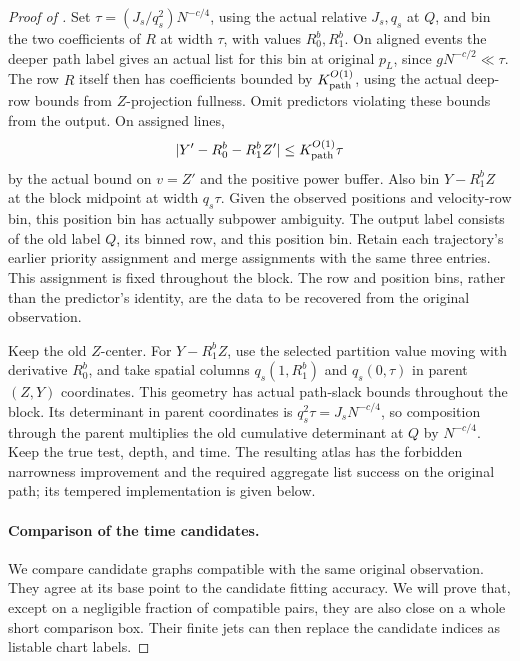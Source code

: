 \begin{proof}[Proof of ]
Set \(\tau=(J_s/q_s^2)N^{-c/4}\), using the actual relative
\(J_s,q_s\) at \(Q\), and bin the two coefficients of \(R\)
at width \(\tau\), with values \(R_0^b,R_1^b\).
On aligned events the deeper path label gives an actual list
for this bin at original \(p_L\), since
\(gN^{-c/2}\ll\tau\).  The row \(R\) itself then has coefficients
bounded by \(K_{\rm path}^{O(1)}\), using the actual deep-row
bounds from \(Z\)-projection fullness.  Omit predictors violating
these bounds from the output.  On assigned lines,
\begin{equation}
|Y'-R_0^b-R_1^b Z'|\le K_{\rm path}^{O(1)}\tau
\end{equation}
by the actual bound on \(v=Z'\) and the positive power buffer.
Also bin \(Y-R_1^bZ\) at the block midpoint at width \(q_s\tau\).
Given the observed positions and velocity-row bin, this position
bin has actually subpower ambiguity.  The output label consists of the old label \(Q\), its binned row, and
this position bin.  Retain each trajectory's earlier priority assignment and merge
assignments with the same three entries.  This assignment is fixed throughout the
block.  The row and position bins, rather than the predictor's identity,
are the data to be recovered from the original observation.

Keep the old \(Z\)-center.  For \(Y-R_1^bZ\), use the selected
partition value moving with derivative \(R_0^b\), and take spatial
columns \(q_s(1,R_1^b)\) and \(q_s(0,\tau)\) in parent
\((Z,Y)\) coordinates.  This geometry has actual path-slack bounds
throughout the block.  Its determinant in parent coordinates is
\(q_s^2\tau=J_sN^{-c/4}\), so composition through the parent
multiplies the old cumulative determinant at \(Q\) by \(N^{-c/4}\).
Keep the true test, depth, and time.  The resulting atlas has the
forbidden narrowness improvement and the required aggregate list
success on the original path; its tempered implementation is given
below.

\paragraph{Comparison of the time candidates.}
We compare candidate graphs compatible with the same original
observation.  They agree at its base point to the candidate fitting
accuracy.  We will prove that, except
on a negligible fraction of compatible pairs, they are also close on
a whole short comparison box.  Their finite jets can then replace the
candidate indices as listable chart labels.


\end{proof}
